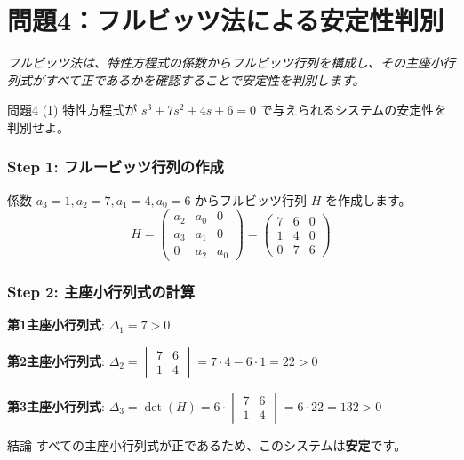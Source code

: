 \documentclass[11pt,a4paper]{ltjsarticle}
\begin{document}
\clearpage

\section{問題4：フルビッツ法による安定性判別}
\textit{フルビッツ法は、特性方程式の係数からフルビッツ行列を構成し、その主座小行列式がすべて正であるかを確認することで安定性を判別します。}

\begin{problem}{問題4 (1)}
    特性方程式が $s^3+7s^2+4s+6=0$ で与えられるシステムの安定性を判別せよ。
\end{problem}

\begin{solution}
    \subsubsection*{Step 1: フルービッツ行列の作成}
    係数 $a_3=1, a_2=7, a_1=4, a_0=6$ からフルビッツ行列 $H$ を作成します。
    $$ H = \begin{pmatrix} a_2 & a_0 & 0 \\ a_3 & a_1 & 0 \\ 0 & a_2 & a_0 \end{pmatrix} = \begin{pmatrix} 7 & 6 & 0 \\ 1 & 4 & 0 \\ 0 & 7 & 6 \end{pmatrix} $$

    \subsubsection*{Step 2: 主座小行列式の計算}
    \textbf{第1主座小行列式}: $\Delta_1 = 7 > 0$
    
    \textbf{第2主座小行列式}: $\Delta_2 = \begin{vmatrix} 7 & 6 \\ 1 & 4 \end{vmatrix} = 7 \cdot 4 - 6 \cdot 1 = 22 > 0$
    
    \textbf{第3主座小行列式}: $\Delta_3 = \det(H) = 6 \cdot \begin{vmatrix} 7 & 6 \\ 1 & 4 \end{vmatrix} = 6 \cdot 22 = 132 > 0$
\end{solution}

\begin{conclusion}{結論}
    すべての主座小行列式が正であるため、このシステムは\textbf{安定}です。
\end{conclusion}
\end{document}

